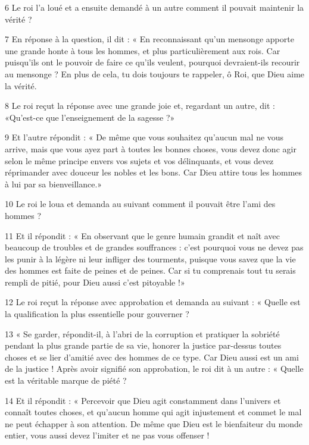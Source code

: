 \par 6 Le roi l'a loué et a ensuite demandé à un autre comment il pouvait maintenir la vérité ?

\par 7 En réponse à la question, il dit : « En reconnaissant qu'un mensonge apporte une grande honte à tous les hommes, et plus particulièrement aux rois. Car puisqu’ils ont le pouvoir de faire ce qu’ils veulent, pourquoi devraient-ils recourir au mensonge ? En plus de cela, tu dois toujours te rappeler, ô Roi, que Dieu aime la vérité.

\par 8 Le roi reçut la réponse avec une grande joie et, regardant un autre, dit : «Qu'est-ce que l'enseignement de la sagesse ?»

\par 9 Et l'autre répondit : « De même que vous souhaitez qu'aucun mal ne vous arrive, mais que vous ayez part à toutes les bonnes choses, vous devez donc agir selon le même principe envers vos sujets et vos délinquants, et vous devez réprimander avec douceur les nobles et les bons. Car Dieu attire tous les hommes à lui par sa bienveillance.»

\par 10 Le roi le loua et demanda au suivant comment il pouvait être l'ami des hommes ?

\par 11 Et il répondit : « En observant que le genre humain grandit et naît avec beaucoup de troubles et de grandes souffrances : c'est pourquoi vous ne devez pas les punir à la légère ni leur infliger des tourments, puisque vous savez que la vie des hommes est faite de peines et de peines. Car si tu comprenais tout tu serais rempli de pitié, pour Dieu aussi c'est pitoyable !»

\par 12 Le roi reçut la réponse avec approbation et demanda au suivant : « Quelle est la qualification la plus essentielle pour gouverner ?

\par 13 « Se garder, répondit-il, à l'abri de la corruption et pratiquer la sobriété pendant la plus grande partie de sa vie, honorer la justice par-dessus toutes choses et se lier d'amitié avec des hommes de ce type. Car Dieu aussi est un ami de la justice ! Après avoir signifié son approbation, le roi dit à un autre : « Quelle est la véritable marque de piété ?

\par 14 Et il répondit : « Percevoir que Dieu agit constamment dans l'univers et connaît toutes choses, et qu'aucun homme qui agit injustement et commet le mal ne peut échapper à son attention. De même que Dieu est le bienfaiteur du monde entier, vous aussi devez l'imiter et ne pas vous offenser !

